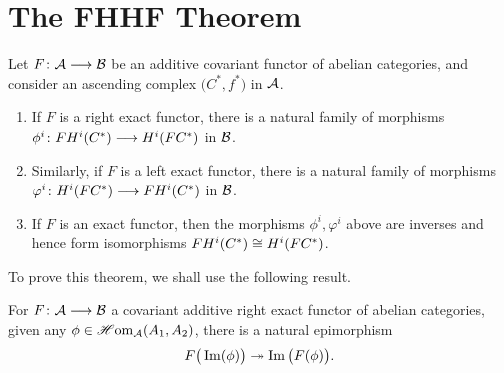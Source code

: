 \documentclass[a4paper]{article}
\def\epi{\twoheadrightarrow}
\begin{document}
\section{The FHHF Theorem}
\begin{Theorem}
    Let $F\colon\mathcal{A}\longrightarrow \mathcal{B}$ be an additive covariant functor of abelian categories, and consider an ascending complex $\big(C^{*}, f^*\big)$ in $\mathcal{A}$.
    \begin{enumerate}
        \item If $F$ is a right exact functor, there is a natural family of morphisms $\phi^i\colon FH^{i}(C^{*})\longrightarrow H^{i}(FC^{*})$ in $\mathcal{B}$.
        \item Similarly, if $F$ is a left exact functor, there is a natural family of morphisms $\varphi^i\colon H^{i}(FC^{*})\longrightarrow FH^{i}(C^{*})$ in $\mathcal{B}$. 
        \item If $F$ is an exact functor, then the morphisms $\phi^i, \varphi^i$ above are inverses and hence form isomorphisms ${FH^{i}(C^{*})} \cong {H^{i}(FC^{*})}$.
    \end{enumerate}
\end{Theorem}
To prove this theorem, we shall use the following result.
\begin{Lemma}
    For $F\colon\mathcal{A}\longrightarrow \mathcal{B}$ a covariant additive right exact functor of abelian categories, given any $\phi \in \operatorname{\mathscr{H}om}_{\mathcal{A}}(A_1,A_2)$, there is a natural epimorphism %
    \[
        F\big(\im(\phi)\big) \epi \im\big(F(\phi)\big).
    \]
\end{Lemma}
\end{document}
